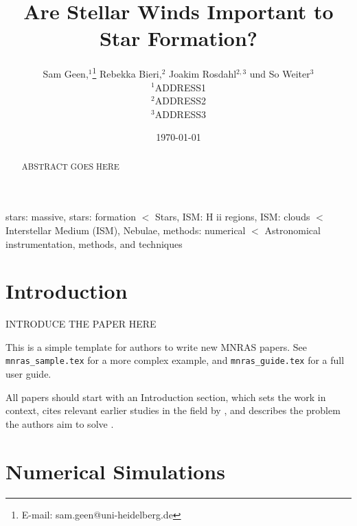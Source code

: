\documentclass[a4paper,fleqn,usenatbib]{mnras}
\title[Are Stellar Winds Important to Star Formation]{Are Stellar Winds Important to Star Formation?}
\author[Geen et al]{
Sam Geen,$^{1}$\thanks{E-mail: sam.geen@uni-heidelberg.de}
Rebekka Bieri,$^{2}$
Joakim Rosdahl$^{2,3}$
und So Weiter$^{3}$
\\
$^{1}$ADDRESS1\\
$^{2}$ADDRESS2\\
$^{3}$ADDRESS3
}
\date{\today}
\begin{document}
\label{firstpage}
\pagerange{\pageref{firstpage}--\pageref{lastpage}}
\maketitle

\begin{abstract}
ABSTRACT GOES HERE
\end{abstract}

\begin{keywords}
stars: massive, stars: formation $<$ Stars, 
ISM: H ii regions, ISM: clouds $<$ Interstellar Medium (ISM), Nebulae,
methods: numerical $<$ Astronomical instrumentation, methods, and techniques
\end{keywords}



\section{Introduction}

INTRODUCE THE PAPER HERE

This is a simple template for authors to write new MNRAS papers.
See \texttt{mnras\_sample.tex} for a more complex example, and \texttt{mnras\_guide.tex}
for a full user guide.

All papers should start with an Introduction section, which sets the work
in context, cites relevant earlier studies in the field by \citet{Others2013},
and describes the problem the authors aim to solve \citep[e.g.][]{Author2012}.

\section{Numerical Simulations}
\label{methods}
\end{document}
